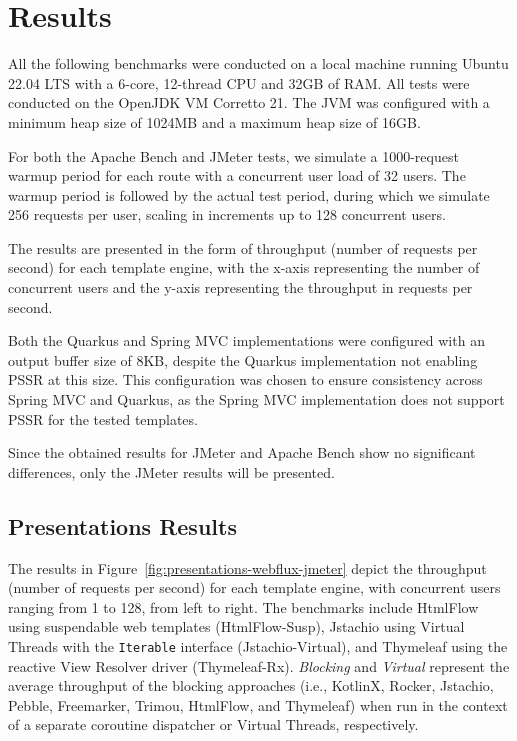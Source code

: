 \section{Results}

All the following benchmarks were conducted on a local machine running Ubuntu
22.04 LTS with a 6-core, 12-thread CPU and 32GB of RAM\@. All tests were
conducted on the OpenJDK VM Corretto 21. The JVM was configured with a minimum
heap size of 1024MB and a maximum heap size of 16GB\@.

For both the Apache Bench and JMeter tests, we simulate a 1000-request warmup
period for each route with a concurrent user load of 32 users. The warmup
period is followed by the actual test period, during which we simulate 256
requests per user, scaling in increments up to 128 concurrent users.

The results are presented in the form of throughput (number of requests per
second) for each template engine, with the x-axis representing the number of
concurrent users and the y-axis representing the throughput in requests per
second.

Both the Quarkus and Spring MVC implementations were configured with an output
buffer size of 8KB, despite the Quarkus implementation not enabling PSSR at
this size. This configuration was chosen to ensure consistency across Spring
MVC and Quarkus, as the Spring MVC implementation does not support PSSR for the
tested templates.

Since the obtained results for JMeter and Apache Bench show no significant
differences, only the JMeter results will be presented.

\subsection{Presentations Results}

The results in Figure~\ref{fig:presentations-webflux-jmeter} depict the
throughput (number of requests per second) for each template engine, with
concurrent users ranging from 1 to 128, from left to right. The benchmarks
include HtmlFlow using suspendable web templates (HtmlFlow-Susp), Jstachio
using Virtual Threads with the \texttt{Iterable} interface (Jstachio-Virtual),
and Thymeleaf using the reactive View Resolver driver (Thymeleaf-Rx).
\textit{Blocking} and \textit{Virtual} represent the average throughput of the
blocking approaches (i.e., KotlinX, Rocker, Jstachio, Pebble, Freemarker,
Trimou, HtmlFlow, and Thymeleaf) when run in the context of a separate
coroutine dispatcher or Virtual Threads, respectively.

